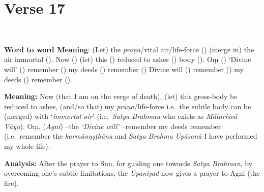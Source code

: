 \chapter{Verse 17}

\begin{moolashloka}
\\
\end{moolashloka}

\textbf{Word to word Meaning}: (Let) the \emph{prāṇa}/vital air/life-force () (merge in) the air immortal (). Now () (let) this () reduced to ashes () body (). Oṃ () `Divine will' () remember () my deeds () remember () Divine will () remember () my deeds () remember ().

\textbf{Meaning:} Now (that I am on the verge of death), (let) this gross-body be reduced to ashes, (and/so that) my \emph{prāṇa}/life-force i.e.\ the subtle body can be (merged) with `\emph{immortal air}' (i.e.\ \emph{Satya Brahman} who exists as \emph{Mātariśvā Vāyu}). Oṃ, (\emph{Agni}) --the \emph{`Divine will'} --remember my deeds remember (i.e.\ remember the \emph{karmānuṣṭhāna} and \emph{Satya Brahma Upāsanā} I have performed my whole life).

\textbf{Analysis:} After the prayer to Sun, for guiding one towards \emph{Satya Brahman}, by overcoming one's subtle limitations, the \emph{Upaniṣad} now gives a prayer to Agni (the fire).

